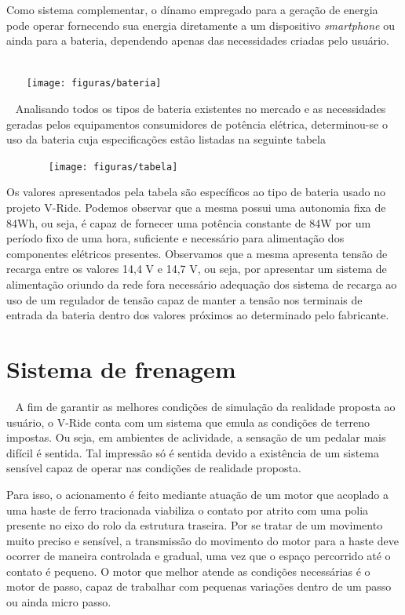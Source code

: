 Como sistema complementar, o dínamo empregado para a geração de energia pode operar fornecendo sua energia diretamente a um dispositivo \textit{smartphone} ou ainda para a bateria, dependendo apenas das necessidades criadas pelo usuário.
                                    
                     
\begin{center}
    \texttt{[image: figuras/bateria]}
    \label{projeto}
\end{center}
  
Analisando todos os tipos de bateria existentes no mercado e as necessidades geradas pelos equipamentos consumidores de potência elétrica, determinou-se o uso da bateria cuja especificações estão listadas na seguinte tabela

\begin{center}
        \texttt{[image: figuras/tabela]}
    \label{tabela}
\end{center}

Os valores apresentados pela tabela são específicos ao tipo de bateria usado no projeto V-Ride. Podemos observar que a mesma possui uma autonomia fixa de 84Wh, ou seja, é capaz de fornecer uma potência constante de 84W por um período fixo de uma hora, suficiente e necessário para alimentação dos componentes elétricos presentes.
Observamos que a mesma apresenta tensão de recarga entre os valores 14,4 V e 14,7 V, ou seja, por apresentar um sistema de alimentação oriundo da rede fora necessário adequação dos sistema de recarga ao uso de um regulador de tensão capaz de manter a tensão nos terminais de entrada da bateria dentro dos valores próximos ao determinado pelo fabricante. 

\section{Sistema de frenagem } 
 
A fim de garantir as melhores condições de simulação da realidade proposta ao usuário, o V-Ride conta com um sistema que emula as condições de terreno impostas. Ou seja, em ambientes de aclividade, a sensação de um pedalar mais difícil é sentida. Tal impressão só é sentida devido a existência de um sistema sensível capaz de operar nas condições de realidade proposta.

Para isso, o acionamento é feito mediante atuação de um motor que acoplado a uma haste de ferro tracionada viabiliza o contato por atrito com uma polia presente no eixo do rolo da estrutura traseira. Por se tratar de um movimento muito preciso e sensível, a transmissão do movimento do motor para a haste deve ocorrer de maneira controlada e gradual, uma vez que o espaço percorrido até o contato é pequeno. O motor que melhor atende as condições necessárias é o motor de passo, capaz de trabalhar com pequenas variações dentro de um passo ou ainda micro passo. 

